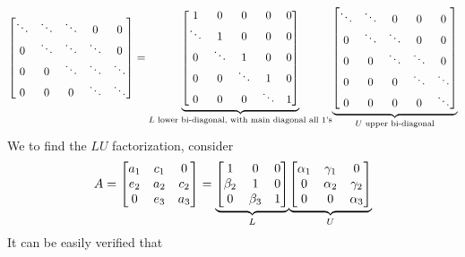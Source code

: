 \begin{itemize}
$$\begin{bmatrix}
            \ddots & \ddots & \ddots & 0 & 0\\
            0 & \ddots & \ddots & \ddots & 0\\
            0 & 0 & \ddots & \ddots & \ddots\\
            0 & 0 & 0 & \ddots & \ddots
        \end{bmatrix}=
        \underlabel{
            \begin{bmatrix}
                1 & 0 & 0 & 0 & 0\\
                \ddots & 1 & 0 & 0 & 0\\
                0 & \ddots & 1 & 0 & 0\\
                0 & 0 & \ddots & 1 & 0\\
                0 & 0 & 0 & \ddots & 1
                \end{bmatrix}
        }{$L$ lower bi-diagonal, with main diagonal all 1's}
        \underlabel{
            \begin{bmatrix}
                \ddots & \ddots & 0 & 0 & 0\\
                0 & \ddots & \ddots & 0 & 0\\
                0 & 0 & \ddots & \ddots & 0\\
                0 & 0 & 0 & \ddots & \ddots\\
                0 & 0 & 0 & 0 & \ddots
            \end{bmatrix}
        }{$U$ upper bi-diagonal}
        $$
        We to find the $LU$ factorization, consider
        $$
        A=\begin{bmatrix}
            a_1 & c_1 & 0\\
            e_2 & a_2 & c_2\\
            0 & e_3 & a_3
        \end{bmatrix}=
        \underlabel{
            \begin{bmatrix}
                1 & 0 & 0\\
                \beta_2 & 1 & 0\\
                0 & \beta_3 & 1            
            \end{bmatrix}    
        }{$L$}
        \underlabel{
            \begin{bmatrix}
                \alpha_1 & \gamma_1 & 0\\
                0 & \alpha_2 & \gamma_2\\
                0 & 0 & \alpha_3
            \end{bmatrix}
        }{$U$}
        $$
        It can be easily verified that
        

\end{itemize}
